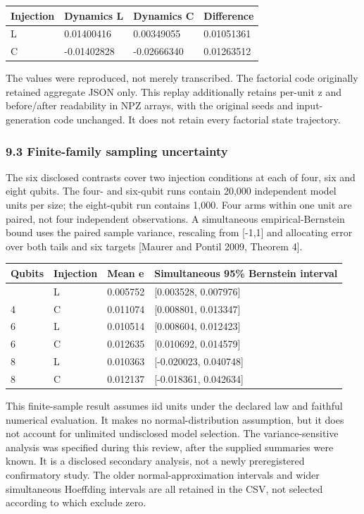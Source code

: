 \documentclass[
  10pt,
  a4paper,
]{article}
\begin{document}
\begin{longtable}[]{@{}llll@{}}
\toprule\noalign{}
Injection & Dynamics L & Dynamics C & Difference \\
\midrule\noalign{}
\endhead
\bottomrule\noalign{}
\endlastfoot
L & 0.01400416 & 0.00349055 & 0.01051361 \\
C & -0.01402828 & -0.02666340 & 0.01263512 \\
\end{longtable}

The values were reproduced, not merely transcribed. The factorial code
originally retained aggregate JSON only. This replay additionally
retains per-unit z and before/after readability in NPZ arrays, with the
original seeds and input-generation code unchanged. It does not retain
every factorial state trajectory.

\subsubsection{9.3 Finite-family sampling
uncertainty}\label{finite-family-sampling-uncertainty}

The six disclosed contrasts cover two injection conditions at each of
four, six and eight qubits. The four- and six-qubit runs contain 20,000
independent model units per size; the eight-qubit run contains 1,000.
Four arms within one unit are paired, not four independent observations.
A simultaneous empirical-Bernstein bound uses the paired sample
variance, rescaling from {[}-1,1{]} and allocating error over both tails
and six targets {[}Maurer and Pontil 2009, Theorem 4{]}.

\begin{longtable}[]{@{}llll@{}}
\toprule\noalign{}
Qubits & Injection & Mean e & Simultaneous 95\% Bernstein interval \\
\midrule\noalign{}
\endhead
\bottomrule\noalign{}
\endlastfoot
4 & L & 0.005752 & {[}0.003528, 0.007976{]} \\
4 & C & 0.011074 & {[}0.008801, 0.013347{]} \\
6 & L & 0.010514 & {[}0.008604, 0.012423{]} \\
6 & C & 0.012635 & {[}0.010692, 0.014579{]} \\
8 & L & 0.010363 & {[}-0.020023, 0.040748{]} \\
8 & C & 0.012137 & {[}-0.018361, 0.042634{]} \\
\end{longtable}

This finite-sample result assumes iid units under the declared law and
faithful numerical evaluation. It makes no normal-distribution
assumption, but it does not account for unlimited undisclosed model
selection. The variance-sensitive analysis was specified during this
review, after the supplied summaries were known. It is a disclosed
secondary analysis, not a newly preregistered confirmatory study. The
older normal-approximation intervals and wider simultaneous Hoeffding
intervals are all retained in the CSV, not selected according to which
exclude zero.
\end{document}

